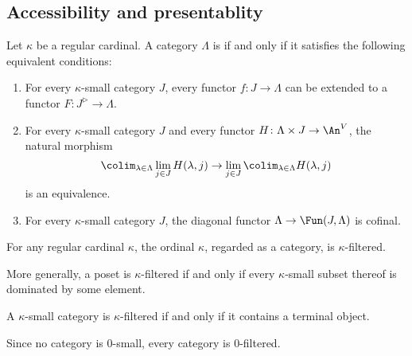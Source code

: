 \subsection{Accessibility and presentablity}%
\label{sub:accessibility_and_presentablity}

\begin{definition}
	Let $ \kappa $ be a regular cardinal.
	A category $ \Lambda $ is  if and only if
	it satisfies the following equivalent conditions:
	\begin{enumerate}
		\item For every $ \kappa $-small category $ J $,
			every functor $ f \colon J \to \Lambda $ can be extended
			to a functor $ F \colon J^{\rhd} \to \Lambda $.
		\item For every $ \kappa $-small category $ J $
			and every functor $ H \colon \Lambda \times J \to \An^V$,
			the natural morphism
			\[
				\colim_{\lambda \in \Lambda} \lim_{j \in J} H(\lambda,j)
				\to
				\lim_{j \in J} \colim_{\lambda \in \Lambda} H(\lambda,j)
			\]
			is an equivalence.
		\item For every $ \kappa $-small category $ J $,
			the diagonal functor
			$ \Lambda \to \Fun(J, \Lambda) $
			is cofinal.
	\end{enumerate}
\end{definition}

\begin{eg}
	For any regular cardinal $ \kappa $,
	the ordinal $ \kappa $, regarded as a category,
	is $ \kappa $-filtered.

	More generally, a poset is $ \kappa $-filtered if and only if
	every $ \kappa $-small subset thereof is dominated by some element.
\end{eg}

\begin{eg}
	A $ \kappa $-small category is $ \kappa $-filtered
	if and only if it contains a terminal object.
\end{eg}

\begin{eg}
	Since no category is $ 0 $-small,
	every category is $ 0 $-filtered.
\end{eg}

